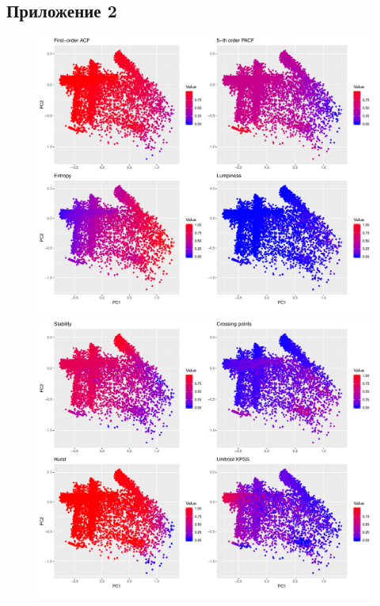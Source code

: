 \documentclass[a4paper,12pt]{article}
\begin{document}
\newpage
\subsection{Приложение 2}
\label{strength}
\begin{figure}[!h]

\begin{center}
 	\includegraphics[width=0.8
 	\textwidth]{str_1}%

 	
 	\includegraphics[width=0.8
 	\textwidth]{str_2}%
\end{center}

\end{figure} 
 
\end{document}
